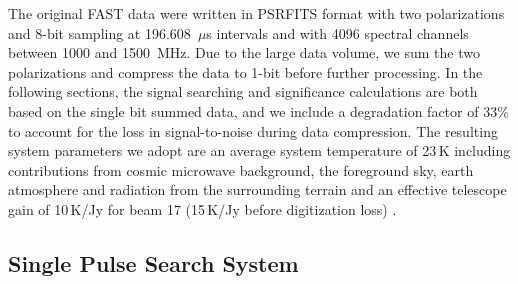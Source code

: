 The original FAST data were written in PSRFITS format \citep{hvm04} with two polarizations and 8-bit sampling at 196.608~$\mu$s intervals and with 4096 spectral channels between 1000 and 1500~MHz. Due to the large data volume, we sum the two polarizations and compress the data to 1-bit before further processing. In the following sections, the signal searching and significance calculations are both based on the single bit summed data, and we include a 
degradation factor of 33\% to account for the loss in signal-to-noise during data compression.
The resulting system parameters we adopt are an average system temperature of 23\,K including contributions from cosmic microwave background, the foreground sky, earth atmosphere and radiation from the surrounding terrain and an effective telescope gain of 10\,K/Jy for beam 17 (15\,K/Jy before digitization loss) \citep{jpy+19,jth+20}.

\subsection{Single Pulse Search System}

